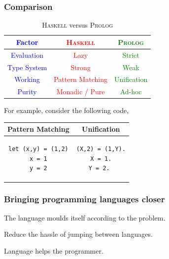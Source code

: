 \documentclass[aspectratio=1610]{beamer}
\begin{document}
\begin{frame}[fragile]
\frametitle{Comparison}
\center
\begin{table}
\begin{tabular}{|c|c|c|}
\hline
\textbf{\textcolor{blue}{Factor}} & \textbf{\textcolor{red}{\textsc{Haskell}}} & \textbf{\textcolor{green}{\textsc{Prolog}}} \\
\hline
\textcolor{blue}{Evaluation} & \textcolor{red}{Lazy} & \textcolor{green}{Strict} \\
\hline
\textcolor{blue}{Type System} & \textcolor{red}{Strong} & \textcolor{green}{Weak} \\
\hline
\textcolor{blue}{Working} & \textcolor{red}{Pattern Matching} & \textcolor{green}{Unification} \\
\hline
\textcolor{blue}{Purity} & \textcolor{red}{Monadic / Pure} & \textcolor{green}{Ad-hoc} \\
\hline
\end{tabular}
\caption{\textsc{Haskell} \cite{haskellorg} versus \textsc{Prolog} \cite{prologwiki}}
\end{table}

For example, consider the following code,

\begin{table}
\begin{tabular}{|c|c|}
\hline

\textbf{Pattern Matching} & \textbf{Unification} \\

\hline
\begin{lstlisting}
let (x,y) = (1,2)
x = 1
y = 2
\end{lstlisting} &
\begin{lstlisting}
(X,2) = (1,Y).
X = 1.
Y = 2. 
\end{lstlisting} \\ 

\hline
\end{tabular}
\end{table}

\end{frame}


\begin{frame}
\frametitle{Bringing programming languages closer}

The language moulds itself according to the problem. 

\hspace{5mm}

Reduce the hassle of jumping between languages. 

\hspace{5mm}

Language helps the programmer. 

\end{frame}
\end{document}
